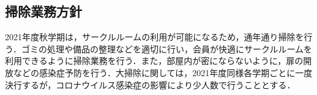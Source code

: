 \subsection*{掃除業務方針}


2021年度秋学期は，サークルルームの利用が可能になるため，通年通り掃除を行う．ゴミの処理や備品の整理などを適切に行い，会員が快適にサークルルームを利用できるように掃除業務を行う．また，部屋内が密にならないように，扉の開放などの感染症予防を行う．大掃除に関しては，2021年度同様各学期ごとに一度決行するが，コロナウイルス感染症の影響により少人数で行うこととする．
